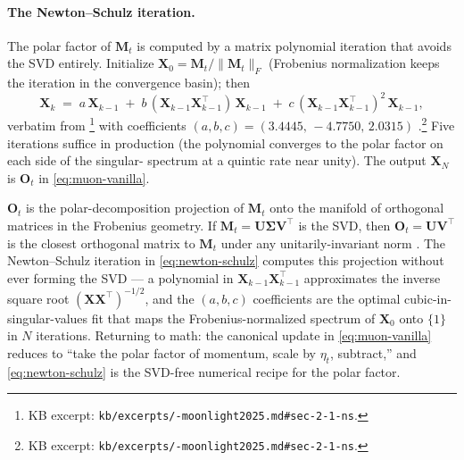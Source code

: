 \paragraph{The Newton--Schulz iteration.}
The polar factor of $\mathbf{M}_t$ is computed by a matrix polynomial
iteration that avoids the SVD entirely. Initialize
$\mathbf{X}_0 = \mathbf{M}_t / \|\mathbf{M}_t\|_F$ (Frobenius
normalization keeps the iteration in the convergence basin); then
\begin{equation}
\mathbf{X}_k \;=\; a\,\mathbf{X}_{k-1}
   \;+\; b\,(\mathbf{X}_{k-1} \mathbf{X}_{k-1}^\top)\,\mathbf{X}_{k-1}
   \;+\; c\,(\mathbf{X}_{k-1} \mathbf{X}_{k-1}^\top)^2\,\mathbf{X}_{k-1},
\label{eq:newton-schulz}
\tag{4}
\end{equation}
verbatim from \citet[\S 2.1, eq.\ 2]{muon-moonlight2025}\footnote{KB
excerpt: \texttt{kb/excerpts/-moonlight2025.md\#sec-2-1-ns}.}
with coefficients
$(a, b, c) = (3.4445,\, -4.7750,\, 2.0315)$
\citep[K.\ Jordan et al.\ 2024, cited in \S
2.1]{muon-moonlight2025}.\footnote{KB excerpt:
\texttt{kb/excerpts/-moonlight2025.md\#sec-2-1-ns}.} Five
iterations suffice in production (the polynomial converges to the
polar factor on each side of the singular- spectrum at a quintic
rate near unity). The output $\mathbf{X}_N$ is $\mathbf{O}_t$ in
\cref{eq:muon-vanilla}.

\begin{analogy}
\label{analogy:polar}
$\mathbf{O}_t$ is the polar-decomposition projection of
$\mathbf{M}_t$ onto the manifold of orthogonal matrices in the
Frobenius geometry. If $\mathbf{M}_t = \mathbf{U} \boldsymbol{\Sigma}
\mathbf{V}^\top$ is the SVD, then $\mathbf{O}_t = \mathbf{U}
\mathbf{V}^\top$ is the closest orthogonal matrix to $\mathbf{M}_t$
under any unitarily-invariant norm
\citep[Mirsky 1960]{muon-moonlight2025}.
The Newton--Schulz iteration in \cref{eq:newton-schulz} computes this
projection without ever forming the SVD --- a polynomial in
$\mathbf{X}_{k-1} \mathbf{X}_{k-1}^\top$ approximates the inverse
square root $(\mathbf{X} \mathbf{X}^\top)^{-1/2}$, and the
$(a, b, c)$ coefficients are the optimal cubic-in-singular-values fit
that maps the Frobenius-normalized spectrum of $\mathbf{X}_0$ onto
$\{1\}$ in $N$ iterations. Returning to math: the canonical 
update in \cref{eq:muon-vanilla} reduces to ``take the polar factor
of momentum, scale by $\eta_t$, subtract,'' and \cref{eq:newton-schulz}
is the SVD-free numerical recipe for the polar factor.
\end{analogy}

